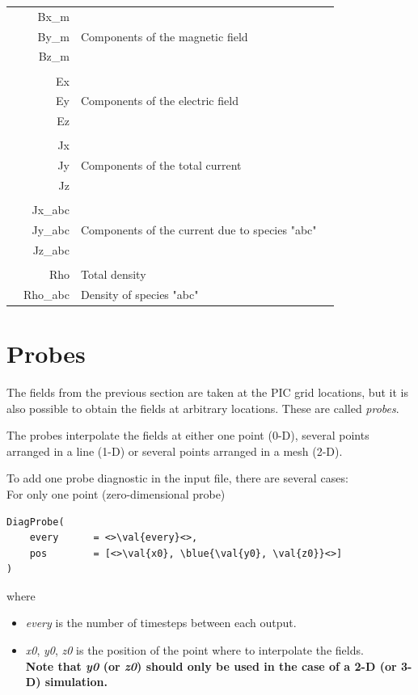 \documentclass[11pt]{article}
\newcommand{\val}[1]{{\ttfamily \textit{#1}}}
\newcommand{\blue}[1]{{\color{blue} #1}}
\begin{document}
\begin{tabularx}{\textwidth}{X r | l X}
& Bx\_m &  & \\
& By\_m &  Components of the magnetic field & \\
& Bz\_m &  & \\
& & & \\
& Ex &  & \\
& Ey & Components of the electric field & \\
& Ez &  & \\
& & & \\
& Jx &  & \\
& Jy & Components of the total current & \\
& Jz &  & \\
& & & \\
& Jx\_abc &  & \\
& Jy\_abc & Components of the current due to species "abc" & \\
& Jz\_abc &  & \\
& & & \\
& Rho & Total density & \\
& Rho\_abc & Density of species "abc" & \\
\end{tabularx}

\clearpage


\section{Probes\label{sec:probes}}

The fields from the previous section are taken at the PIC grid locations, but it is also possible to obtain
the fields at arbitrary locations. These are called \textit{probes}.

The probes interpolate the fields at either one point (0-D), several points arranged in a line (1-D) or several points arranged in a mesh (2-D).

To add one probe diagnostic in the input file, there are several cases:\\
For only one point (zero-dimensional probe)
\begin{lstlisting}
DiagProbe(
    every      = <>\val{every}<>,
    pos        = [<>\val{x0}, \blue{\val{y0}, \val{z0}}<>]
)
\end{lstlisting}
where
\begin{itemize}
\item \val{every} is the number of timesteps between each output.
\item \val{x0}, \val{y0}, \val{z0} is the position of the point where to interpolate the fields.\\
\textbf{Note that \val{y0} (or \val{z0}) should only be used in the case of a 2-D (or 3-D) simulation.}
\end{itemize}
\end{document}
